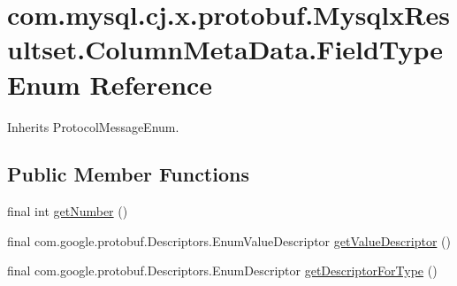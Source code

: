 \hypertarget{enumcom_1_1mysql_1_1cj_1_1x_1_1protobuf_1_1_mysqlx_resultset_1_1_column_meta_data_1_1_field_type}{}\section{com.\+mysql.\+cj.\+x.\+protobuf.\+Mysqlx\+Resultset.\+Column\+Meta\+Data.\+Field\+Type Enum Reference}
\label{enumcom_1_1mysql_1_1cj_1_1x_1_1protobuf_1_1_mysqlx_resultset_1_1_column_meta_data_1_1_field_type}


Inherits Protocol\+Message\+Enum.

\subsection*{Public Member Functions}
\begin{DoxyCompactItemize}
\item 
final int \mbox{\hyperlink{enumcom_1_1mysql_1_1cj_1_1x_1_1protobuf_1_1_mysqlx_resultset_1_1_column_meta_data_1_1_field_type_a22c4155f705dd97c86167f6d378b87cb}{get\+Number}} ()
\item 
final com.\+google.\+protobuf.\+Descriptors.\+Enum\+Value\+Descriptor \mbox{\hyperlink{enumcom_1_1mysql_1_1cj_1_1x_1_1protobuf_1_1_mysqlx_resultset_1_1_column_meta_data_1_1_field_type_acfe1b01a0f1eb0d82b7735e5930be583}{get\+Value\+Descriptor}} ()
\item 
final com.\+google.\+protobuf.\+Descriptors.\+Enum\+Descriptor \mbox{\hyperlink{enumcom_1_1mysql_1_1cj_1_1x_1_1protobuf_1_1_mysqlx_resultset_1_1_column_meta_data_1_1_field_type_a6cd807dea1565236f9f699e48e44f58c}{get\+Descriptor\+For\+Type}} ()
\end{DoxyCompactItemize}
